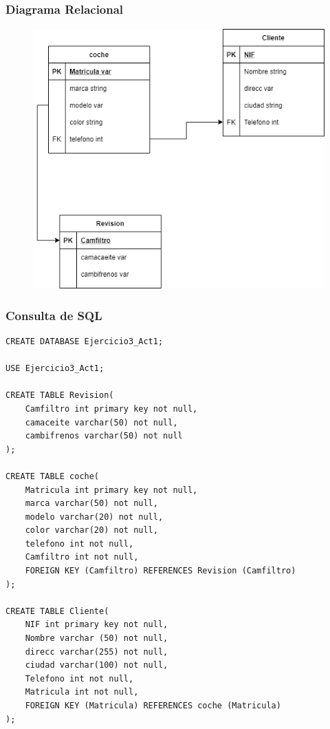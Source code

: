 \documentclass[a4paper, 12pt]{article}
\begin{document}
\begin{justify}
        \subsubsection{Diagrama Relacional}
        \begin{figure}[H]
            \centering
            \includegraphics[width=16cm,height=10cm]{rel3.png}
        \end{figure}
        \subsubsection{Consulta de SQL}
\begin{verbatim}
CREATE DATABASE Ejercicio3_Act1;

USE Ejercicio3_Act1;

CREATE TABLE Revision(
    Camfiltro int primary key not null,
    camaceite varchar(50) not null,
    cambifrenos varchar(50) not null
);

CREATE TABLE coche(
    Matricula int primary key not null,
    marca varchar(50) not null,
    modelo varchar(20) not null,
    color varchar(20) not null,
    telefono int not null,
    Camfiltro int not null,
    FOREIGN KEY (Camfiltro) REFERENCES Revision (Camfiltro)
);

CREATE TABLE Cliente(
    NIF int primary key not null,
    Nombre varchar (50) not null,
    direcc varchar(255) not null,
    ciudad varchar(100) not null,
    Telefono int not null,
    Matricula int not null,
    FOREIGN KEY (Matricula) REFERENCES coche (Matricula)
);
\end{verbatim}

\end{justify}
\end{document}
